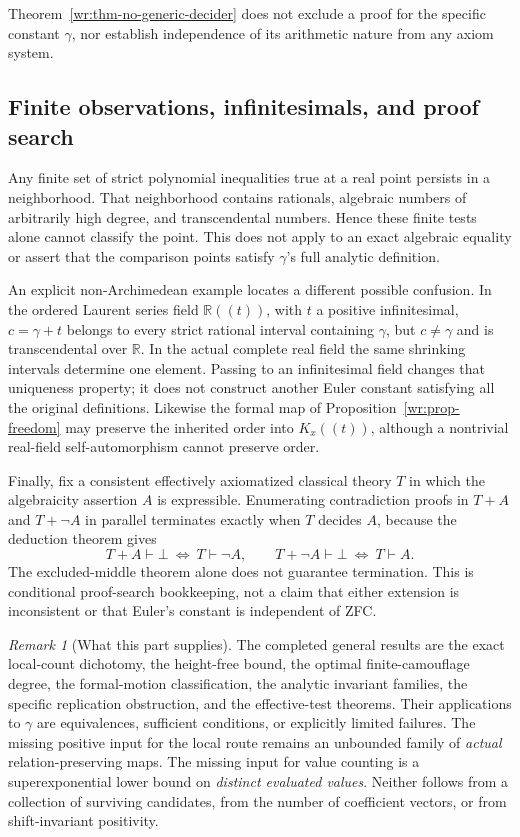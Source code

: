 \documentclass[11pt,a4paper]{article}
\newcommand{\R}{\mathbb R}
\theoremstyle{definition}
\theoremstyle{remark}
\newtheorem{remark}[theorem]{Remark}
\numberwithin{equation}{section}
\begin{document}
Theorem~\ref{wr:thm-no-generic-decider} does not exclude a proof for the
specific constant \(\gamma\), nor establish independence of its
arithmetic nature from any axiom system.

\subsection{Finite observations, infinitesimals, and proof search}

Any finite set of strict polynomial inequalities true at a real point
persists in a neighborhood. That neighborhood contains rationals,
algebraic numbers of arbitrarily high degree, and transcendental
numbers. Hence these finite tests alone cannot classify the point.
This does not apply to an exact algebraic equality or assert that the
comparison points satisfy \(\gamma\)'s full analytic definition.

An explicit non-Archimedean example locates a different possible
confusion. In the ordered Laurent series field \(\R((t))\), with \(t\)
a positive infinitesimal, \(c=\gamma+t\) belongs to every strict
rational interval containing \(\gamma\), but \(c\ne\gamma\) and is
transcendental over \(\R\). In the actual complete real field the same
shrinking intervals determine one element. Passing to an infinitesimal
field changes that uniqueness property; it does not construct another
Euler constant satisfying all the original definitions. Likewise the
formal map of Proposition~\ref{wr:prop-freedom} may preserve the
inherited order into \(K_x((t))\), although a nontrivial real-field
self-automorphism cannot preserve order.

Finally, fix a consistent effectively axiomatized classical theory
\(T\) in which the algebraicity assertion \(A\) is expressible.
Enumerating contradiction proofs in \(T+A\) and \(T+\neg A\) in
parallel terminates exactly when \(T\) decides \(A\), because the
deduction theorem gives
\[
 T+A\vdash\bot\ \Longleftrightarrow\ T\vdash\neg A,
 \qquad
 T+\neg A\vdash\bot\ \Longleftrightarrow\ T\vdash A.
\]
The excluded-middle theorem alone does not guarantee termination. This
is conditional proof-search bookkeeping, not a claim that either
extension is inconsistent or that Euler's constant is independent of
ZFC.

\begin{remark}[What this part supplies]\label{wr:rem-status}
The completed general results are the exact local-count dichotomy,
the height-free bound, the optimal finite-camouflage degree, the
formal-motion classification, the analytic invariant families, the
specific replication obstruction, and the effective-test theorems.
Their applications to \(\gamma\) are equivalences, sufficient
conditions, or explicitly limited failures. The missing positive input
for the local route remains an unbounded family of \emph{actual}
relation-preserving maps. The missing input for value counting is a
superexponential lower bound on \emph{distinct evaluated values}.
Neither follows from a collection of surviving candidates, from the
number of coefficient vectors, or from shift-invariant positivity.
\end{remark}
\end{document}
